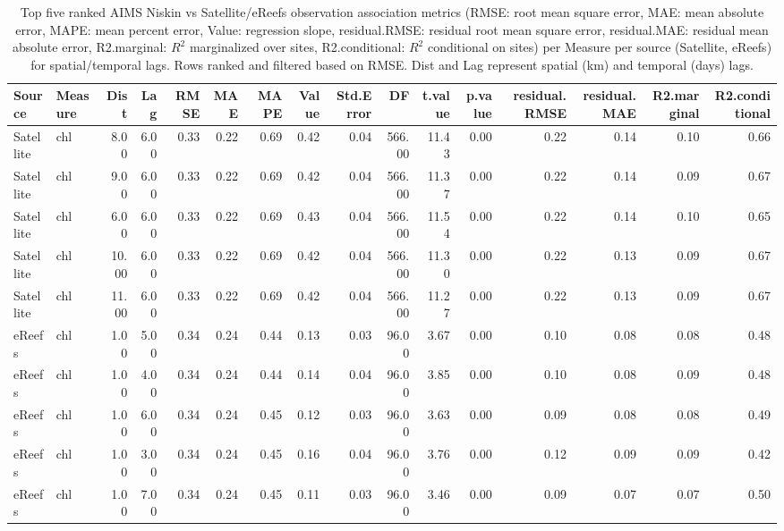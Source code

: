 \begin{table}[ht]
\centering
\caption[Top five ranked AIMS Niskin vs Satellite/eReefs observation association metrics (ordered by RMSE)]{Top five ranked AIMS Niskin vs Satellite/eReefs observation association metrics (RMSE: root mean square error, MAE: mean absolute error, MAPE: mean percent error, Value: regression slope, residual.RMSE: residual root mean square error, residual.MAE: residual mean absolute error, R2.marginal: $R^2$ marginalized over sites, R2.conditional: $R^2$ conditional on sites) per Measure per source (Satellite, eReefs) for spatial/temporal lags.  Rows ranked and filtered based on RMSE. Dist and Lag represent spatial (km) and temporal (days) lags.} 
\label{tab:comp.all.rmse.sum.max}
\begingroup\scriptsize
\begin{tabular}{llrrrrrrrrrrrrrr}
  \toprule
Source & Measure & Dist & Lag & RMSE & MAE & MAPE & Value & Std.Error & DF & t.value & p.value & residual.RMSE & residual.MAE & R2.marginal & R2.conditional \\ 
  \midrule
Satellite & chl & 8.00 & 6.00 & 0.33 & 0.22 & 0.69 & 0.42 & 0.04 & 566.00 & 11.43 & 0.00 & 0.22 & 0.14 & 0.10 & 0.66 \\ 
  Satellite & chl & 9.00 & 6.00 & 0.33 & 0.22 & 0.69 & 0.42 & 0.04 & 566.00 & 11.37 & 0.00 & 0.22 & 0.14 & 0.09 & 0.67 \\ 
  Satellite & chl & 6.00 & 6.00 & 0.33 & 0.22 & 0.69 & 0.43 & 0.04 & 566.00 & 11.54 & 0.00 & 0.22 & 0.14 & 0.10 & 0.65 \\ 
  Satellite & chl & 10.00 & 6.00 & 0.33 & 0.22 & 0.69 & 0.42 & 0.04 & 566.00 & 11.30 & 0.00 & 0.22 & 0.13 & 0.09 & 0.67 \\ 
  Satellite & chl & 11.00 & 6.00 & 0.33 & 0.22 & 0.69 & 0.42 & 0.04 & 566.00 & 11.27 & 0.00 & 0.22 & 0.13 & 0.09 & 0.67 \\ 
  eReefs & chl & 1.00 & 5.00 & 0.34 & 0.24 & 0.44 & 0.13 & 0.03 & 96.00 & 3.67 & 0.00 & 0.10 & 0.08 & 0.08 & 0.48 \\ 
  eReefs & chl & 1.00 & 4.00 & 0.34 & 0.24 & 0.44 & 0.14 & 0.04 & 96.00 & 3.85 & 0.00 & 0.10 & 0.08 & 0.09 & 0.48 \\ 
  eReefs & chl & 1.00 & 6.00 & 0.34 & 0.24 & 0.45 & 0.12 & 0.03 & 96.00 & 3.63 & 0.00 & 0.09 & 0.08 & 0.08 & 0.49 \\ 
  eReefs & chl & 1.00 & 3.00 & 0.34 & 0.24 & 0.45 & 0.16 & 0.04 & 96.00 & 3.76 & 0.00 & 0.12 & 0.09 & 0.09 & 0.42 \\ 
  eReefs & chl & 1.00 & 7.00 & 0.34 & 0.24 & 0.45 & 0.11 & 0.03 & 96.00 & 3.46 & 0.00 & 0.09 & 0.07 & 0.07 & 0.50 \\ 

\end{tabular}
\end{table}
